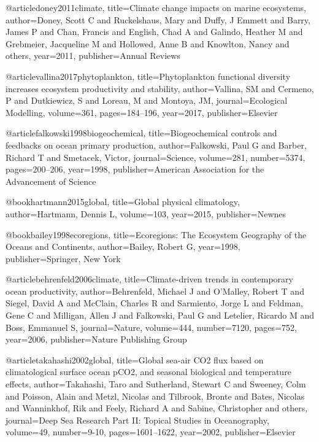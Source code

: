 {{{{{{{{{{{{@article{doney2011climate,
  title={Climate change impacts on marine ecosystems},
  author={Doney, Scott C and Ruckelshaus, Mary and Duffy, J Emmett and Barry, James P and Chan, Francis and English, Chad A and Galindo, Heather M and Grebmeier, Jacqueline M and Hollowed, Anne B and Knowlton, Nancy and others},
  year={2011},
  publisher={Annual Reviews}
}


@article{vallina2017phytoplankton,
  title={Phytoplankton functional diversity increases ecosystem productivity and stability},
  author={Vallina, SM and Cermeno, P and Dutkiewicz, S and Loreau, M and Montoya, JM},
  journal={Ecological Modelling},
  volume={361},
  pages={184--196},
  year={2017},
  publisher={Elsevier}
}

@article{falkowski1998biogeochemical,
  title={Biogeochemical controls and feedbacks on ocean primary production},
  author={Falkowski, Paul G and Barber, Richard T and Smetacek, Victor},
  journal={Science},
  volume={281},
  number={5374},
  pages={200--206},
  year={1998},
  publisher={American Association for the Advancement of Science}
}

@book{hartmann2015global,
  title={Global physical climatology},
  author={Hartmann, Dennis L},
  volume={103},
  year={2015},
  publisher={Newnes}
}

@book{bailey1998ecoregions,
  title={Ecoregions: The Ecosystem Geography of the Oceans and Continents},
  author={Bailey, Robert G},
  year={1998},
  publisher={Springer, New York}
}


@article{behrenfeld2006climate,
  title={Climate-driven trends in contemporary ocean productivity},
  author={Behrenfeld, Michael J and O’Malley, Robert T and Siegel, David A and McClain, Charles R and Sarmiento, Jorge L and Feldman, Gene C and Milligan, Allen J and Falkowski, Paul G and Letelier, Ricardo M and Boss, Emmanuel S},
  journal={Nature},
  volume={444},
  number={7120},
  pages={752},
  year={2006},
  publisher={Nature Publishing Group}
}


@article{takahashi2002global,
  title={Global sea-air CO2 flux based on climatological surface ocean pCO2, and seasonal biological and temperature effects},
  author={Takahashi, Taro and Sutherland, Stewart C and Sweeney, Colm and Poisson, Alain and Metzl, Nicolas and Tilbrook, Bronte and Bates, Nicolas and Wanninkhof, Rik and Feely, Richard A and Sabine, Christopher and others},
  journal={Deep Sea Research Part II: Topical Studies in Oceanography},
  volume={49},
  number={9-10},
  pages={1601--1622},
  year={2002},
  publisher={Elsevier}
}

}}}}}}}}}}}}
